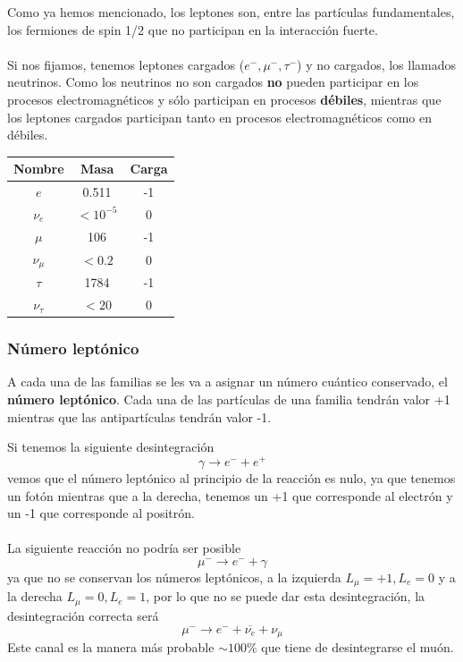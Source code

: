 \begin{minipage}{0.6\textwidth}
    Como ya hemos mencionado, los leptones son, entre las partículas fundamentales, los fermiones de spin 1/2 que no participan en la interacción fuerte. \\\\
Si nos fijamos, tenemos leptones cargados ($e^-, \mu^-, \tau^-$) y no cargados, los llamados neutrinos. Como los neutrinos no son cargados \textbf{no} pueden participar en los procesos electromagnéticos y sólo participan en procesos \textbf{débiles}, mientras que los leptones cargados participan tanto en procesos electromagnéticos como en débiles.
\end{minipage}
\hfill
\begin{minipage}{0.3\textwidth}
\centering
\begin{tabular}{|c c c|}
\hline
{Nombre}       & {Masa } & {Carga } \\ \hline
$e$                   & 0.511                     & -1                 
\\ 
$\nu_e$    & $<10^{-5}$                & 0                  
\\ \hline
$\mu$                 & 106                       & -1                 
\\ 
$\nu_\mu$             & $<0.2$                    & 0                  
\\ \hline
$\tau$                & 1784                      & -1                 \\ 
$\nu_\tau$            & $<20$                     & 0                  
\\ \hline
\end{tabular}
\label{tab:leptones}
\end{minipage}
\subsubsection{Número leptónico}
A cada una de las familias se les va a asignar un número cuántico conservado, el \textbf{número leptónico}. Cada una de las partículas de una familia tendrán valor +1 mientras que las antipartículas tendrán valor -1.
\begin{tcolorbox}[colback=airforceblue!20, colframe=airforceblue, title=Ejemplo: Conservación del núemero leptónico ]
 Si tenemos la siguiente desintegración$$\gamma \longrightarrow e^-+e^+$$ vemos que el número leptónico al principio de la reacción es nulo, ya que tenemos un fotón mientras que a la derecha, tenemos un +1 que corresponde al electrón y un -1 que corresponde al positrón.\\\\
 La siguiente reacción no podría ser posible
 $$\mu^- \longrightarrow e^- +\gamma$$ ya que no se conservan los números leptónicos, a la izquierda $L_\mu=+1, L_e=0$ y a la derecha $L_\mu=0, L_e=1$, por lo que no se puede dar esta desintegración, la desintegración correcta será $$\mu^- \longrightarrow e^- +\overline{\nu_e}+\nu_\mu$$ Este canal es la manera más probable $\sim 100\%$ que tiene de desintegrarse el muón.
\end{tcolorbox}

